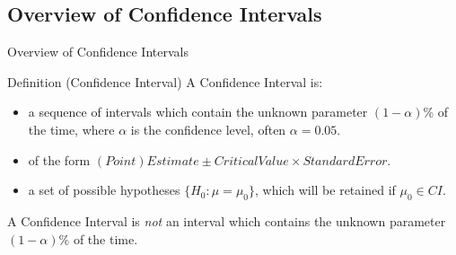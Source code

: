 \documentclass[t,xcolor=pdftex,dvipsnames,table]{beamer}\usepackage[]{graphicx}\usepackage[]{color}
\begin{document}
\subsection[Confidence Intervals]{Overview of Confidence Intervals}
\begin{frame}{Overview of Confidence Intervals}

\begin{block}{Definition (Confidence Interval)}
A Confidence Interval is:
\begin{itemize}
\item a sequence of intervals which contain the unknown parameter $(1-\alpha)$\% of the time, where $\alpha$ is the confidence level, often $\alpha = 0.05$.
\href{https://gauss17gon.shinyapps.io/conf_intervals/}{}
\item of the form $(Point) Estimate \pm Critical Value \times Standard Error$.
\item a set of possible hypotheses $\{ H_{0}: \mu = \mu_{0} \}$, which will be retained if $\mu_{0} \in CI$.
\end{itemize}

\vspace{.5cm}
A Confidence Interval is {\it not} an interval which contains the unknown parameter $(1-\alpha)$\% of the time.
\end{block}
\end{frame}
\end{document}
